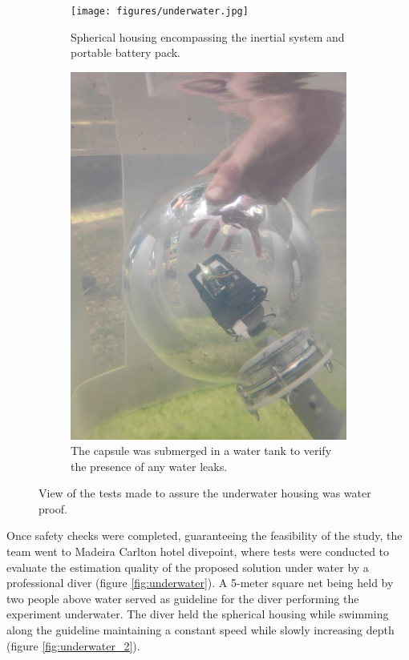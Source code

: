 \begin{figure}[!h]
    \centering
    \begin{subfigure}{0.45\textwidth}
        \centering
        \texttt{[image: figures/underwater.jpg]}
        \caption{ Spherical housing encompassing the inertial system and portable battery pack. }
        \label{fig:underwater1_test}
    \end{subfigure}
    \begin{subfigure}{0.45\textwidth}
        \centering
        \includegraphics[width=1\textwidth]{figures/underwater_1.jpg}
        \caption{ The capsule was submerged in a water tank to verify the presence of any water leaks. }
        \label{fig:underwater2_test}
    \end{subfigure}
    \label{fig:underwater_test}
    \caption{ View of the tests made to assure the underwater housing was water proof. }
\end{figure}

Once safety checks were completed, guaranteeing the feasibility of the study, the team went to Madeira Carlton hotel divepoint, where tests were conducted to evaluate the estimation quality of the proposed solution under water by a professional diver (figure \ref{fig:underwater}). A 5-meter square net being held by two people above water served as guideline for the diver performing the experiment underwater. The diver held the spherical housing while swimming along the guideline maintaining a constant speed while slowly increasing depth (figure \ref{fig:underwater_2}).

